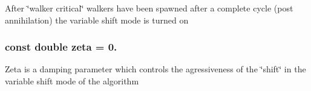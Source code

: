 After \char`\"{}walker critical\char`\"{} walkers have been spawned after a complete cycle (post annihilation) the variable shift mode is turned on \hypertarget{UEG__MAIN__binarytest_8C_a50fb6782013c8c12243ca553cee0971a}{
\subsubsection[{zeta}]{\setlength{\rightskip}{0pt plus 5cm}const double zeta = 0.}}\label{UEG__MAIN__binarytest_8C_a50fb6782013c8c12243ca553cee0971a}
Zeta is a damping parameter which controls the agressiveness of the \char`\"{}shift\char`\"{} in the variable shift mode of the algorithm 